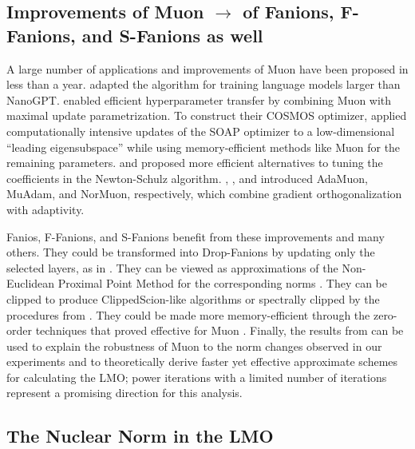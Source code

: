 \documentclass[a4paper,14pt,oneside]{extarticle}
\begin{document}
\subsection{Improvements of Muon $\rightarrow$ of Fanions, F-Fanions, and S-Fanions as well}
A large number of applications and improvements of Muon have been proposed in less than a year. \citet{liu2025muonscalablellmtraining} adapted the algorithm for training language models larger than NanoGPT. \citet{shah2025practical} enabled efficient hyperparameter transfer by combining Muon with maximal update parametrization. To construct their COSMOS optimizer, \citet{chen2025cosmoshybridadaptive} applied computationally intensive updates of the SOAP optimizer \citep{vyas2025soap} to a low-dimensional ``leading eigensubspace'' while using memory-efficient methods like Muon for the remaining parameters. \citet{amsel2025polar} and \citet{grishina2025chebyshev} proposed more efficient alternatives to tuning the coefficients in the Newton-Schulz algorithm. \citet{si2025adamuon}, \citet{veprikov2025preconditioned}, and \citet{li2025normuon} introduced AdaMuon, MuAdam, and NorMuon, respectively, which combine gradient orthogonalization with adaptivity.

Fanios, F-Fanions, and S-Fanions benefit from these improvements and many others. They could be transformed into Drop-Fanions by updating only the selected layers, as in \citep{gruntkowska2025dropmuon}. They can be viewed as approximations of the Non-Euclidean Proximal Point Method for the corresponding norms \citep{gruntkowska2025noneuclideanbroximal}. They can be clipped to produce ClippedScion-like algorithms \citep{pethick2025generalizedgradientnormclipping} or spectrally clipped by the procedures from \citep{yukhimchuk2026spectralclipping,jiang2026llmspectralclipping}. They could be made more memory-efficient through the zero-order techniques that proved effective for Muon \citep{petrov2025zeromuon}. Finally, the results from \citep{shulgin2025inexactmuon} can be used to explain the robustness of Muon to the norm changes observed in our experiments and to theoretically derive faster yet effective approximate schemes for calculating the LMO; power iterations with a limited number of iterations represent a promising direction for this analysis.

\subsection{The Nuclear Norm in the LMO}
\end{document}
